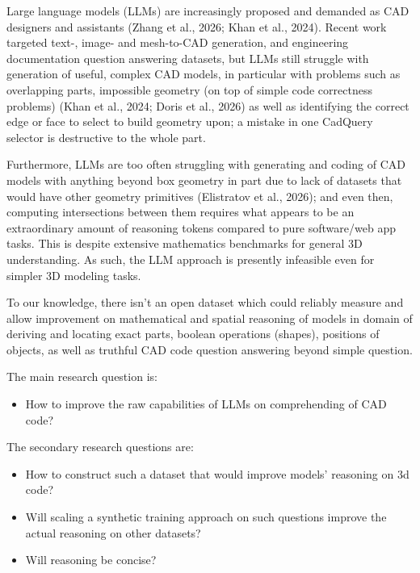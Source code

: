 \documentclass[10pt]{article}
\begin{document}
Large language models (LLMs) are increasingly proposed and demanded as CAD designers and assistants (Zhang et al., 2026; Khan et al., 2024). Recent work targeted text-, image- and mesh-to-CAD generation, and engineering documentation question answering datasets, but LLMs still struggle with generation of useful, complex CAD models, in particular with problems such as overlapping parts, impossible geometry (on top of simple code correctness problems) (Khan et al., 2024; Doris et al., 2026) as well as identifying the correct edge or face to select to build geometry upon; a mistake in one CadQuery selector is destructive to the whole part.

Furthermore, LLMs are too often struggling with generating and coding of CAD models with anything beyond box geometry in part due to lack of datasets that would have other geometry primitives (Elistratov et al., 2026); and even then, computing intersections between them requires what appears to be an extraordinary amount of reasoning tokens compared to pure software/web app tasks. This is despite extensive mathematics benchmarks for general 3D understanding. As such, the LLM approach is presently infeasible even for simpler 3D modeling tasks.

To our knowledge, there isn't an open dataset which could reliably measure and allow improvement on mathematical and spatial reasoning of models in domain of deriving and locating exact parts, boolean operations (shapes), positions of objects, as well as truthful CAD code question answering beyond simple question.

The main research question is:
\begin{itemize}
  \item How to improve the raw capabilities of LLMs on comprehending of CAD code?
\end{itemize}

The secondary research questions are:
\begin{itemize}
  \item How to construct such a dataset that would improve models' reasoning on 3d code?
  \item Will scaling a synthetic training approach on such questions improve the actual reasoning on other datasets?
  \item Will reasoning be concise?
\end{itemize}
\end{document}
